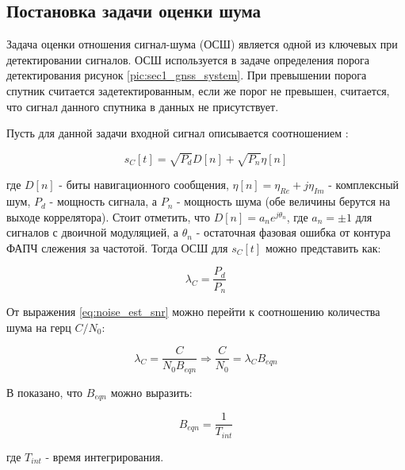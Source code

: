 \subsection{Постановка задачи оценки шума}
\label{sssec:sec1_noise_est}

Задача оценки отношения сигнал-шума (ОСШ) является одной из ключевых при детектировании сигналов.
ОСШ используется в задаче определения порога детектирования рисунок \ref{pic:sec1_gnss_system}.
При превышении порога спутник считается задетектированным, если же порог
не превышен, считается, что сигнал данного спутника в данных не присутствует.

Пусть для данной задачи входной сигнал описывается соотношением \cite{presti_ieee}:
\begin{center}
\begin{equation}
	\label{eq:noise_est_signal}
	s_C[t]=\sqrt{P_d}D[n] + \sqrt{P_n}\eta[n]
\end{equation}
\end{center}
где $D[n]$ - биты навигационного сообщения, $\eta[n]=\eta_{Re} + j\eta_{Im}$ - комплексный шум,
$P_d$ - мощность сигнала, а $P_n$ - мощность шума (обе величины берутся на выходе коррелятора).
Стоит отметить, что $D[n]=a_{n}e^{j\theta_n}$, где $a_n=\pm{1}$ для сигналов с двоичной модуляцией, а
$\theta_n$ - остаточная фазовая ошибка от контура ФАПЧ слежения за частотой.
Тогда ОСШ для $s_C[t]$ можно представить как:
\begin{center}
\begin{equation}
	\label{eq:noise_est_snr}
	\lambda_C=\frac{P_d}{P_n}
\end{equation}
\end{center}
От выражения \ref{eq:noise_est_snr} можно перейти к соотношению количества шума на герц $C/N_0$:
\begin{center}
\begin{equation}
	\label{eq:noise_est_cn}
	\lambda_C=\frac{C}{N_{0}B_{eqn}}\Rightarrow\frac{C}{N_0}=\lambda_{C}B_{eqn}
\end{equation}
\end{center}
В \cite{presti_ieee} показано, что $B_{eqn}$ можно выразить:
\begin{center}
\begin{equation}
	\label{eq:noise_est_beqn}
	B_{eqn}=\frac{1}{T_{int}}
\end{equation}
\end{center}
где ${T_{int}}$ - время интегрирования.


